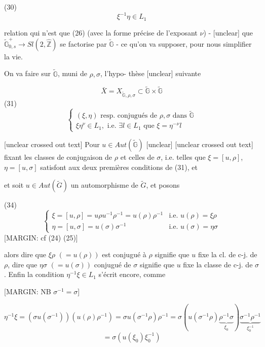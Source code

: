 (30) $$\xi^{-1} \eta \in L_1$$

relation qui n'est que (26) (avec la forme précise de
l'exposant $\nu$) - [unclear] que
$\tilde{\mathbb{G}}_{0,s}^+ \to Sl(2, \hat{\mathbb{Z}})$
se factorise par $\tilde{\mathbb{G}}$ - ce qu'on
va supposer, pour nous simplifier la vie.

On va faire sur $\tilde{\mathbb{G}}$, muni de $\rho, \sigma$, l'hypo-
thèse [unclear] suivante

$$ \bar{X} = X_{\tilde{\mathbb{G}},\rho,\sigma} \subset \tilde{\mathbb{G}} \times \tilde{\mathbb{G}} $$
(31)
$$ \left\{ \begin{array}{l} (\xi, \eta) \text{ resp. conjugués de } \rho, \sigma \text{ dans } \tilde{\mathbb{G}} \\ \xi \eta^{\nu} \in L_1, \text{ i.e. } \exists l \in L_1 \text{ que } \xi = \eta^{-\nu} l \end{array} \right. $$

[unclear crossed out text]
Pour $u \in Aut(\tilde{\mathbb{G}})$ [unclear]
[unclear crossed out text] fixant les classes de conjugaison de $\rho$
et celles de $\sigma$, i.e. telles que
$\xi = [u, \rho]$, $\eta = [u, \sigma]$
satisfont aux deux premières conditions de (31), et

\newpage


et soit $u \in Aut (\tilde{G})$ un automorphisme de $\tilde{G}$,
et posons

(34)
$$ \begin{cases} \xi = [u,\rho] = u \rho u^{-1} \rho^{-1} = u(\rho) \rho^{-1} & \text{i.e. } u(\rho) = \xi \rho \\ \eta = [u,\sigma] = u(\sigma) \sigma^{-1} & \text{i.e. } u(\sigma) = \eta \sigma \end{cases} $$
[MARGIN: cf (24) (25)]

alors dire que $\xi \rho$ $(=u(\rho))$ est conjugué à $\rho$ signifie que
$u$ fixe la cl. de c-j. de $\rho$, dire que $\eta \sigma$ $(=u(\sigma))$
conjugué de $\sigma$ signifie que $u$ fixe la classe de
c-j. de $\sigma$. Enfin la condition $\eta^{-1} \xi \in L_1$ s'écrit
encore, comme

[MARGIN: NB $\sigma^{-1} = \sigma$]

$$ \eta^{-1} \xi = (\sigma u(\sigma^{-1})) (u(\rho) \rho^{-1}) = \sigma u(\sigma^{-1} \rho) \rho^{-1} = \sigma (u(\sigma^{-1} \rho) \underbrace{\rho^{-1} \sigma}_{\xi_0}) \underbrace{\sigma^{-1} \rho^{-1}}_{\xi_0^{-1}} $$
$$ = \sigma (u(\xi_0) \xi_0^{-1}) $$

